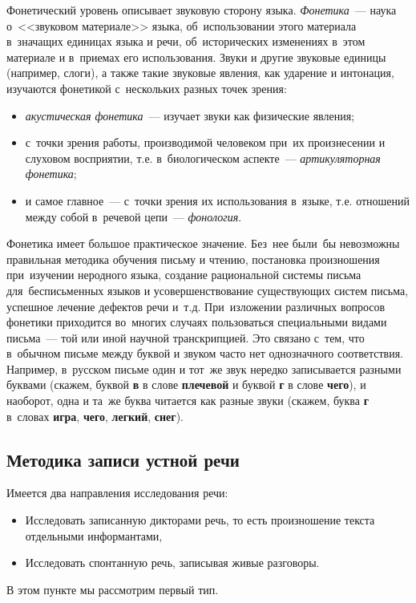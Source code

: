 \documentclass[12pt]{article}
\theoremstyle{definition}
\theoremstyle{remark}
\numberwithin{equation}{section}
\begin{document}
Фонетический уровень описывает звуковую сторону языка. {\sl Фонетика}~---
наука о~<<звуковом материале>> языка, об~использовании этого
материала в~значащих единицах языка и речи, об~исторических изменениях
в~этом материале и в~приемах его использования. Звуки и другие звуковые
единицы (например, слоги), а также такие звуковые явления, как ударение
и интонация, изучаются фонетикой с~нескольких разных точек зрения:
\begin{itemize}
    \item {\sl акустическая фонетика}~--- изучает звуки как физические
    явления;
    \item с~точки зрения работы, производимой человеком при~их произнесении
    и слуховом восприятии, т.е. в~биологическом аспекте~--- {\sl артикуляторная
    фонетика};
    \item и самое главное~--- с~точки зрения их использования в~языке, т.е.
    отношений между собой в~речевой цепи~--- {\sl фонология}.
\end{itemize}

Фонетика имеет большое практическое значение. Без~нее были~бы
невозможны правильная методика обучения письму и чтению, постановка
произношения при~изучении неродного языка, создание рациональной
системы письма для~бесписьменных языков и усовершенствование
существующих систем письма, успешное лечение дефектов речи и~т.д.
При~изложении различных вопросов фонетики приходится во~многих
случаях пользоваться специальными видами письма~--- той или иной
научной транскрипцией. Это связано с~тем, что в~обычном письме
между буквой и звуком часто нет однозначного соответствия.
Например, в~русском письме один и тот~же звук нередко записывается
разными буквами (скажем, буквой {\bf в} в слове {\bf плечевой} и буквой {\bf г}
в слове {\bf чего}), и наоборот, одна и та~же буква читается как разные
звуки (скажем, буква {\bf г} в~словах {\bf игра}, {\bf чего},
{\bf легкий}, {\bf снег}).

\subsection{Методика записи устной речи}
Имеется два направления исследования речи:
\begin{itemize}
    \item Исследовать записанную дикторами речь, то есть произношение
    текста отдельными информантами,
    \item Исследовать спонтанную речь, записывая живые разговоры.
\end{itemize}
В этом пункте мы рассмотрим первый тип.
\end{document}
